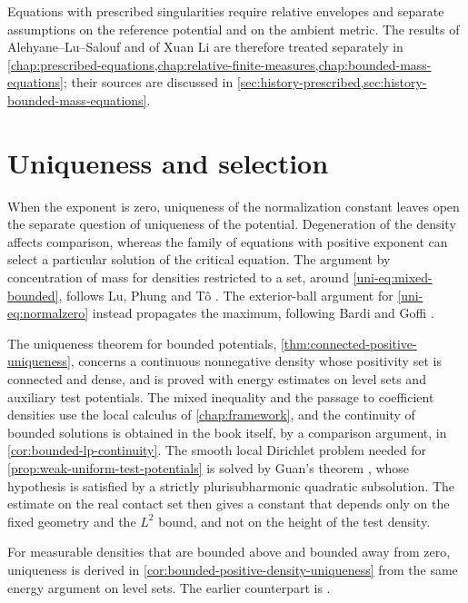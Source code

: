 Equations with prescribed singularities require relative envelopes and separate assumptions on the reference potential and on the ambient metric. The results of Alehyane--Lu--Salouf and of Xuan Li \cite{ALS26,XL26} are therefore treated separately in \cref{chap:prescribed-equations,chap:relative-finite-measures,chap:bounded-mass-equations}; their sources are discussed in \cref{sec:history-prescribed,sec:history-bounded-mass-equations}.

\section{Uniqueness and selection}
\label{sec:history-uniqueness}

When the exponent is zero, uniqueness of the normalization constant leaves open the separate question of uniqueness of the potential. Degeneration of the density affects comparison, whereas the family of equations with positive exponent can select a particular solution of the critical equation. The argument by concentration of mass for densities restricted to a set, around \eqref{uni-eq:mixed-bounded}, follows Lu, Phung and T{\^o} \cite[proof of Theorem~3.7 and Remark~3.8, pp.~2033--2035]{LPT20}. The exterior-ball argument for \eqref{uni-eq:normalzero} instead propagates the maximum, following Bardi and Goffi \cite[Proposition~2.4 and Theorem~2.5, pp.~7--8]{BG18}.

The uniqueness theorem for bounded potentials, \cref{thm:connected-positive-uniqueness}, concerns a continuous nonnegative density whose positivity set is connected and dense, and is proved with energy estimates on level sets and auxiliary test potentials. The mixed inequality and the passage to coefficient densities use the local calculus of \cref{chap:framework}, and the continuity of bounded solutions is obtained in the book itself, by a comparison argument, in \cref{cor:bounded-lp-continuity}. The smooth local Dirichlet problem needed for \cref{prop:weak-uniform-test-potentials} is solved by Guan's theorem \cite[Theorem 1.1, pp.~687--688]{Guan98}, whose hypothesis is satisfied by a strictly plurisubharmonic quadratic subsolution. The estimate on the real contact set then gives a constant that depends only on the fixed geometry and the $L^2$ bound, and not on the height of the test density.

For measurable densities that are bounded above and bounded away from zero, uniqueness is derived in \cref{cor:bounded-positive-density-uniqueness} from the same energy argument on level sets. The earlier counterpart is \cite[Corollary~3.9, p.~287, and Remark~3.13, p.~289]{KN19}.

